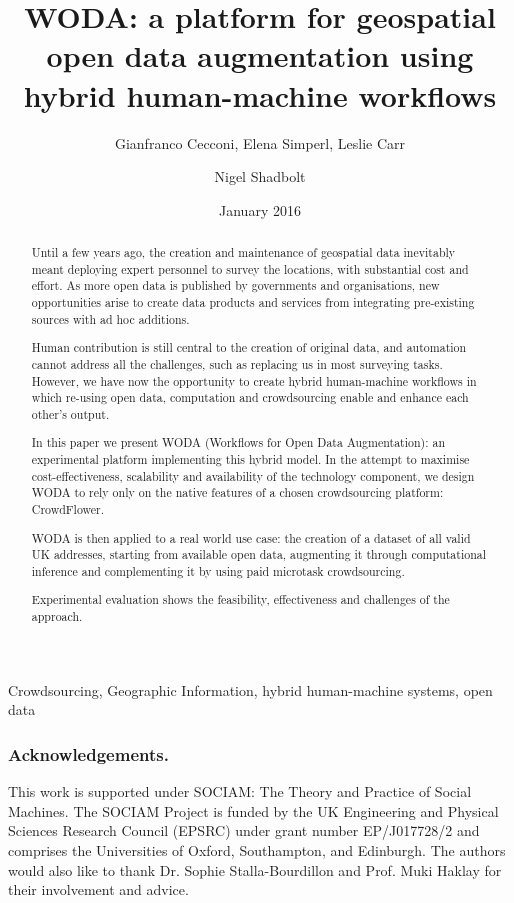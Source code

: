 \documentclass{llncs}
\title{WODA: a platform for geospatial open data augmentation using hybrid human-machine workflows}
\author{Gianfranco Cecconi\inst{1}, Elena Simperl\inst{1}, Leslie Carr\inst{1} \and Nigel Shadbolt\inst{2}}
\institute{University of Southampton \email{\{gc1a13||e.simperl||lac\}@soton.ac.uk} \and University of Oxford \email{nigel.shadbolt@jesus.ox.ac.uk}}
\date{January 2016}
\begin{document}
\maketitle

\begin{abstract}
Until a few years ago, the creation and maintenance of geospatial data inevitably meant deploying expert personnel to survey the locations, with substantial cost and effort. As more open data is published by governments and organisations, new opportunities arise to create data products and services from integrating pre-existing sources with ad hoc additions.

Human contribution is still central to the creation of original data, and automation cannot address all the challenges, such as replacing us in most surveying tasks. However, we have now the opportunity to create hybrid human-machine workflows in which re-using open data, computation and crowdsourcing enable and enhance each other's output. 

In this paper we present WODA (Workflows for Open Data Augmentation): an experimental platform implementing this hybrid model. In the attempt to maximise cost-effectiveness, scalability and availability of the technology component, we design WODA to rely only on the native features of a chosen crowdsourcing platform: CrowdFlower. 

WODA is then applied to a real world use case: the creation of a dataset of all valid UK addresses, starting from available open data, augmenting it through computational inference and complementing it by using paid microtask crowdsourcing. 

Experimental evaluation shows the feasibility, effectiveness and challenges of the approach.
\end{abstract}

\begin{keywords}
Crowdsourcing, Geographic Information, hybrid human-machine systems, open data 
\end{keywords}









\subsubsection{Acknowledgements.} This work is supported under SOCIAM: The Theory and Practice of Social Machines. The SOCIAM Project is funded by the UK Engineering and Physical Sciences Research Council (EPSRC) under grant number EP/J017728/2 and comprises the Universities of Oxford, Southampton, and Edinburgh. The authors would also like to thank Dr. Sophie Stalla-Bourdillon and Prof. Muki Haklay for their involvement and advice. 


\end{document}
